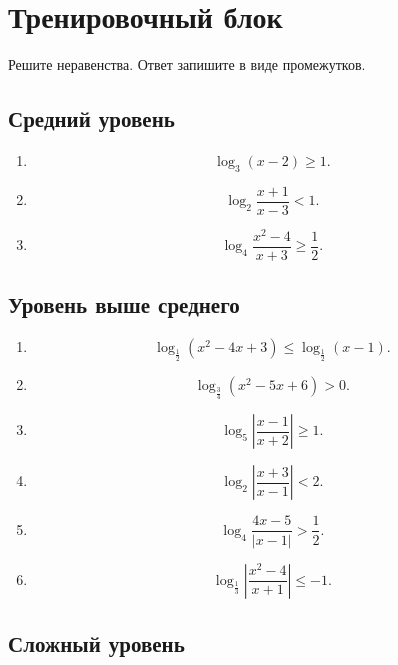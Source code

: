 \documentclass[a4paper,12pt]{article}
\begin{document}
\newpage

\section{Тренировочный блок}

Решите неравенства. Ответ запишите в виде промежутков.

\subsection*{Средний уровень}

\begin{enumerate}
    \item
    \[
        \log_3(x-2)\ge 1.
    \]

    \item
    \[
        \log_2\frac{x+1}{x-3}<1.
    \]

    \item
    \[
        \log_4\frac{x^2-4}{x+3}\ge \frac12.
    \]
\end{enumerate}

\subsection*{Уровень выше среднего}

\begin{enumerate}[resume]
    \item
    \[
        \log_{\frac12}(x^2-4x+3)\le \log_{\frac12}(x-1).
    \]

    \item
    \[
        \log_{\frac34}(x^2-5x+6)>0.
    \]

    \item
    \[
        \log_5\left|\frac{x-1}{x+2}\right|\ge 1.
    \]

    \item
    \[
        \log_2\left|\frac{x+3}{x-1}\right|<2.
    \]

    \item
    \[
        \log_4\frac{4x-5}{|x-1|}>\frac12.
    \]

    \item
    \[
        \log_{\frac13}\left|\frac{x^2-4}{x+1}\right|\le -1.
    \]
\end{enumerate}

\subsection*{Сложный уровень}
\end{document}
